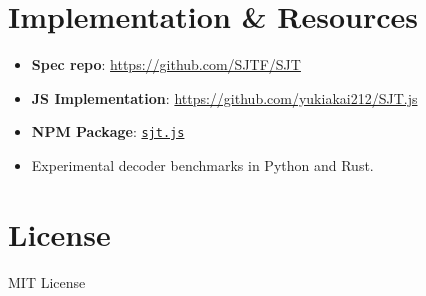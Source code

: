 \documentclass[12pt]{article}
\begin{document}
\section{Implementation \& Resources}
\begin{itemize}
  \item \textbf{Spec repo}: \url{https://github.com/SJTF/SJT}
  \item \textbf{JS Implementation}: \url{https://github.com/yukiakai212/SJT.js}
  \item \textbf{NPM Package}: \href{https://www.npmjs.com/package/sjt.js}{\texttt{sjt.js}}
  \item Experimental decoder benchmarks in Python and Rust.
\end{itemize}

\section{License}
MIT License
\end{document}
